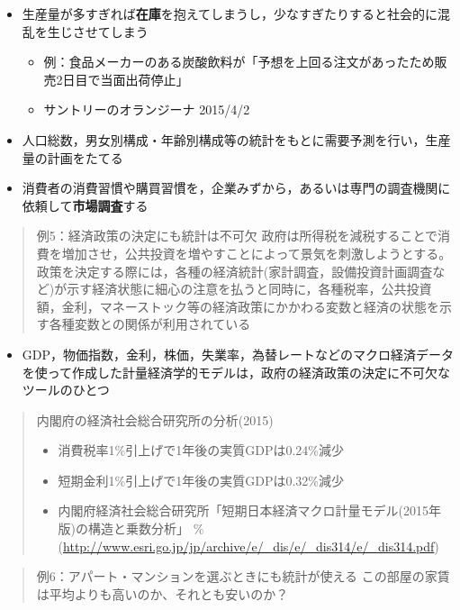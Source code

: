 \documentclass[
]{book}
\providecommand{\tightlist}{%
  \setlength{\itemsep}{0pt}\setlength{\parskip}{0pt}}
\theoremstyle{definition}
\theoremstyle{definition}
\theoremstyle{definition}
\theoremstyle{definition}
\theoremstyle{remark}
\begin{document}
\begin{itemize}
\tightlist
\item
  生産量が多すぎれば\textbf{在庫}を抱えてしまうし，少なすぎたりすると社会的に混乱を生じさせてしまう

  \begin{itemize}
  \tightlist
  \item
    例：食品メーカーのある炭酸飲料が「予想を上回る注文があったため販売2日目で当面出荷停止」
  \item
    サントリーのオランジーナ 2015/4/2
  \end{itemize}
\item
  人口総数，男女別構成・年齢別構成等の統計をもとに需要予測を行い，生産量の計画をたてる
\item
  消費者の消費習慣や購買習慣を，企業みずから，あるいは専門の調査機関に依頼して\textbf{市場調査}する
\end{itemize}

\begin{quote}
例5：経済政策の決定にも統計は不可欠
政府は所得税を減税することで消費を増加させ，公共投資を増やすことによって景気を刺激しようとする。政策を決定する際には，各種の経済統計(家計調査，設備投資計画調査など)が示す経済状態に細心の注意を払うと同時に，各種税率，公共投資額，金利，マネーストック等の経済政策にかかわる変数と経済の状態を示す各種変数との関係が利用されている
\end{quote}

\begin{itemize}
\tightlist
\item
  GDP，物価指数，金利，株価，失業率，為替レートなどのマクロ経済データを使って作成した計量経済学的モデルは，政府の経済政策の決定に不可欠なツールのひとつ
\end{itemize}

\begin{quote}
内閣府の経済社会総合研究所の分析(2015)

\begin{itemize}
\tightlist
\item
  消費税率1\%引上げで1年後の実質GDPは0.24\%減少
\item
  短期金利1\%引上げで1年後の実質GDPは0.32\%減少
\item
  内閣府経済社会総合研究所「短期日本経済マクロ計量モデル(2015年版)の構造と乗数分析」
  \%(\url{http://www.esri.go.jp/jp/archive/e/_dis/e/_dis314/e/_dis314.pdf})
\end{itemize}
\end{quote}

\begin{quote}
例6：アパート・マンションを選ぶときにも統計が使える
この部屋の家賃は平均よりも高いのか、それとも安いのか？
\end{quote}
\end{document}
